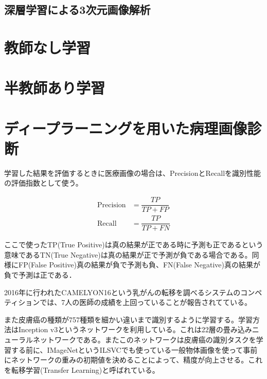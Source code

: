\subsection*{深層学習による3次元画像解析}

\section{教師なし学習}

\section{半教師あり学習}

\section{ディープラーニングを用いた病理画像診断}
学習した結果を評価するときに医療画像の場合は、PrecisionとRecallを識別性能の評価指数として使う。

\begin{align}
  \mathrm{Precision} & = \dfrac{TP}{TP+FP}\\
  \mathrm{Recall} & = \dfrac{TP}{TP+FN}
\end{align}

ここで使ったTP(True Positive)は真の結果が正である時に予測も正であるという意味であるTN(True Negative)は真の結果が正で予測が負である場合である。同様にFP(False Positive)真の結果が負で予測も負、FN(False Negative)真の結果が負で予測は正である．

2016年に行われたCAMELYON16という乳がんの転移を調べるシステムのコンペティションでは、7人の医師の成績を上回っていることが報告されてている。

また皮膚癌の種類が757種類を細かい違いまで識別するように学習する。学習方法はInception v3というネットワークを利用している。これは22層の畳み込みニューラルネットワークである。またこのネットワークは皮膚癌の識別タスクを学習する前に、IMageNetというILSVCでも使っている一般物体画像を使って事前にネットワークの重みの初期値を決めることによって、精度が向上させる。これを転移学習(Transfer Learning)と呼ばれている。
